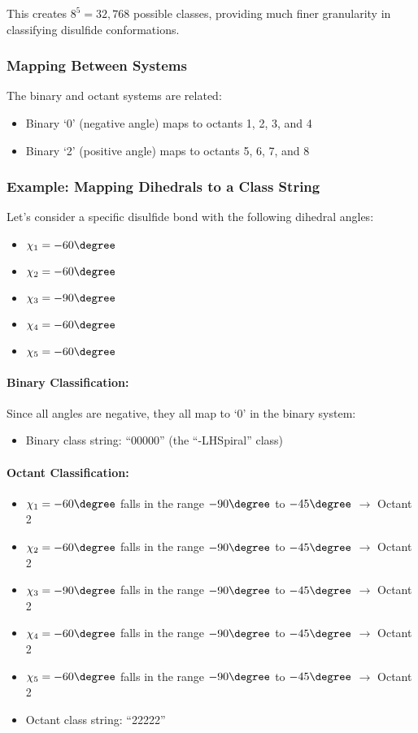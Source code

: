 This creates $8^5 = 32,768$ possible classes, providing much finer granularity in classifying disulfide conformations.

\subsubsection{Mapping Between Systems}
The binary and octant systems are related:
\begin{itemize}
    \item Binary `0' (negative angle) maps to octants 1, 2, 3, and 4
    \item Binary `2' (positive angle) maps to octants 5, 6, 7, and 8
\end{itemize}

\subsubsection{Example: Mapping Dihedrals to a Class String}
Let's consider a specific disulfide bond with the following dihedral angles:
\begin{itemize}
    \item $\chi_1 = -60\degree$
    \item $\chi_2 = -60\degree$
    \item $\chi_3 = -90\degree$
    \item $\chi_4 = -60\degree$
    \item $\chi_5 = -60\degree$
\end{itemize}

\paragraph{Binary Classification:}
Since all angles are negative, they all map to `0' in the binary system:
\begin{itemize}
    \item Binary class string: ``00000'' (the ``-LHSpiral'' class)
\end{itemize}

\paragraph{Octant Classification:}
\begin{itemize}
    \item $\chi_1 = -60\degree$ falls in the range $-90\degree$ to $-45\degree$ $\rightarrow$ Octant 2
    \item $\chi_2 = -60\degree$ falls in the range $-90\degree$ to $-45\degree$ $\rightarrow$ Octant 2
    \item $\chi_3 = -90\degree$ falls in the range $-90\degree$ to $-45\degree$ $\rightarrow$ Octant 2
    \item $\chi_4 = -60\degree$ falls in the range $-90\degree$ to $-45\degree$ $\rightarrow$ Octant 2
    \item $\chi_5 = -60\degree$ falls in the range $-90\degree$ to $-45\degree$ $\rightarrow$ Octant 2
    \item Octant class string: ``22222''
\end{itemize}

